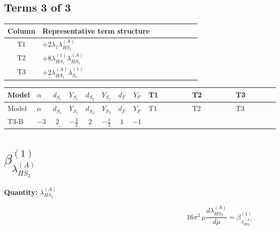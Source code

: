 \documentclass[8pt]{article}
\begin{document}
\begin{landscape}
\subsection*{Terms 3 of 3}
\begin{center}
\begin{tabular}{@{}c >{\raggedright\arraybackslash}p{0.82\linewidth}@{}}
\toprule
Column & Representative term structure \\
\midrule
T1 & \(\displaystyle +2 {\lambda_1} {\lambda_{HS_1}^{(A)}}\) \\
\midrule
T2 & \(\displaystyle +8 {\lambda_{HS_1}^{(1)}} {\lambda_{HS_1}^{(A)}}\) \\
\midrule
T3 & \(\displaystyle +2 {\lambda_{HS_1}^{(A)}} {\lambda_{S_1}^{(1)}}\) \\
\midrule
\bottomrule
\end{tabular}
\end{center}
\smallskip
\tiny
\begin{longtable}{@{}llcccccc >{\raggedright\arraybackslash}p{0.21\linewidth} >{\raggedright\arraybackslash}p{0.21\linewidth} >{\raggedright\arraybackslash}p{0.21\linewidth}@{}}
\toprule
Model & $\alpha$ & $d_{S_1}$ & $Y_{S_1}$ & $d_{S_2}$ & $Y_{S_2}$ & $d_F$ & $Y_F$ & T1 & T2 & T3 \\
\midrule
\endfirsthead
\toprule
Model & $\alpha$ & $d_{S_1}$ & $Y_{S_1}$ & $d_{S_2}$ & $Y_{S_2}$ & $d_F$ & $Y_F$ & T1 & T2 & T3 \\
\midrule
\endhead
T3-B & $-3$ & $2$ & $-\frac{3}{2}$ & $2$ & $-\frac{1}{2}$ & $1$ & $-1$ & \scriptsize\adjustbox{max width=\linewidth}{$\begin{gathered} +2 {\lambda_1} {\lambda_{HS_1}^{(A)}}\end{gathered}$} & \scriptsize\adjustbox{max width=\linewidth}{$\begin{gathered} +8 {\lambda_{HS_1}^{(1)}} {\lambda_{HS_1}^{(A)}}\end{gathered}$} & \scriptsize\adjustbox{max width=\linewidth}{$\begin{gathered} +2 {\lambda_{HS_1}^{(A)}} {\lambda_{S_1}^{(1)}}\end{gathered}$} \\
\midrule
\bottomrule
\end{longtable}
\clearpage
\section*{$\beta_{\lambda_{HS_2}^{(A)}}^{(1)}$}
\noindent\textbf{Quantity: }$\lambda_{HS_2}^{(A)}$\par\smallskip
\[16\pi^2\,\mu\frac{d \lambda_{HS_2}^{(A)}}{d\mu}=\beta_{\lambda_{HS_2}^{(A)}}^{(1)}\]

\end{landscape}
\end{document}
